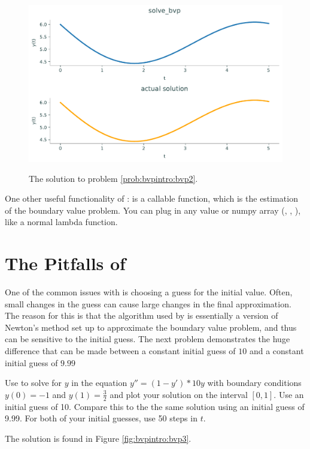 \begin{figure}[H]
\label{fig:bvpintro:bvp2}
    \centering
    \includegraphics[height=3in]{figures/problem2.pdf}
    \caption{The solution to problem \ref{prob:bvpintro:bvp2}.}
\end{figure}

One other useful functionality of :  is a callable function, which is the estimation of the boundary value problem. 
You can plug in any value or numpy array (, , ), like a normal lambda function.

\section*{The Pitfalls of }
One of the common issues with  is choosing a guess for the initial value.
Often, small changes in the guess can cause large changes in the final approximation. 
The reason for this is that the algorithm used by  is essentially a version of Newton's method set up to approximate the boundary value problem, and thus can be sensitive to the initial guess.
The next problem demonstrates the huge difference that can be made between a constant initial guess of $10$ and a constant initial guess of $9.99$

\begin{problem}
    \label{prob:bvpintro:bvp3}
    Use  to solve for $y$ in the equation $y''=(1-y')*10y$ with boundary conditions $y(0)=-1$ and $y(1)=\frac{3}{2}$ and plot your solution on the interval $[0,1]$. Use an initial guess of 10.
    Compare this to the the same solution using an initial guess of 9.99.
    For both of your initial guesses, use 50 steps in \(t\).

    The solution is found in Figure \ref{fig:bvpintro:bvp3}.
\end{problem}

